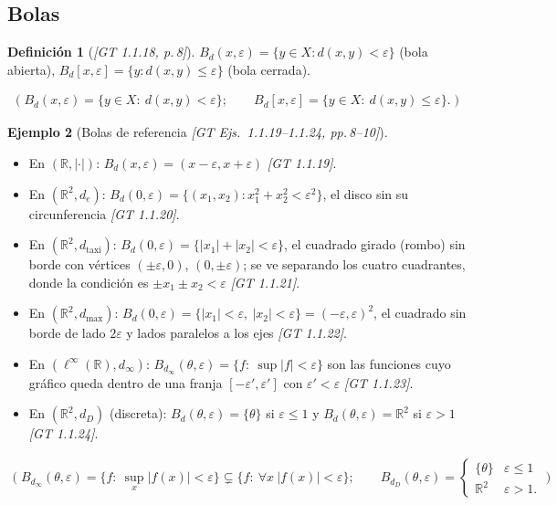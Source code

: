 \documentclass[11pt,a4paper]{article}
\newenvironment{lista}{\leavevmode\begin{itemize}[leftmargin=1.5em,itemsep=1pt,topsep=2pt,parsep=0pt]}{\end{itemize}}
\newcommand{\lgc}[1]{\par\vspace{-3pt}\begin{gather*}\big(\;#1\;\big)\end{gather*}\vspace{-6pt}}
\theoremstyle{definition}
\newtheorem{definicion}{Definición}[section]
\newtheorem{ejemplo}[definicion]{Ejemplo}
\theoremstyle{plain}
\newcommand{\fnt}[1]{{\normalfont\small\itshape\color{gray!150!black}[#1]}}
\newcommand{\R}{\mathbb{R}}
\newcommand{\Bola}[2]{B_d(#1,#2)}
\newcommand{\Bolac}[2]{B_d[#1,#2]}
\begin{document}
\subsection{Bolas}\label{sec:bolas}

\begin{definicion}[\fnt{GT 1.1.18, p.\,8}]
$\Bola{x}{\varepsilon}=\{y\in X: d(x,y)<\varepsilon\}$ (bola abierta), $\Bolac{x}{\varepsilon}=\{y: d(x,y)\le\varepsilon\}$ (bola cerrada).
\lgc{\Bola{x}{\varepsilon}=\{y\in X:\ d(x,y)<\varepsilon\};\qquad
\Bolac{x}{\varepsilon}=\{y\in X:\ d(x,y)\le\varepsilon\}.}
\end{definicion}

\begin{ejemplo}[Bolas de referencia \fnt{GT Ejs.\ 1.1.19--1.1.24, pp.\,8--10}]\label{hu:bolas}
\begin{lista}
\item En $(\R,|\cdot|)$: $\Bola{x}{\varepsilon}=(x-\varepsilon,x+\varepsilon)$ \fnt{GT 1.1.19}.
\item En $(\R^2,d_e)$: $\Bola{0}{\varepsilon}=\{(x_1,x_2): x_1^2+x_2^2<\varepsilon^2\}$, el disco sin su circunferencia \fnt{GT 1.1.20}.
\item En $(\R^2,d_{\text{taxi}})$: $\Bola{0}{\varepsilon}=\{|x_1|+|x_2|<\varepsilon\}$, el cuadrado girado (rombo) sin borde con vértices $(\pm\varepsilon,0)$, $(0,\pm\varepsilon)$; se ve separando los cuatro cuadrantes, donde la condición es $\pm x_1\pm x_2<\varepsilon$ \fnt{GT 1.1.21}.
\item En $(\R^2,d_{\max})$: $\Bola{0}{\varepsilon}=\{|x_1|<\varepsilon,\ |x_2|<\varepsilon\}=(-\varepsilon,\varepsilon)^2$, el cuadrado sin borde de lado $2\varepsilon$ y lados paralelos a los ejes \fnt{GT 1.1.22}.
\item En $(\ell^\infty(\R),d_\infty)$: $B_{d_\infty}(\theta,\varepsilon)=\{f:\ \sup|f|<\varepsilon\}$ son las funciones cuyo gráfico queda dentro de una franja $[-\varepsilon',\varepsilon']$ con $\varepsilon'<\varepsilon$ \fnt{GT 1.1.23}.
\item En $(\R^2,d_D)$ (discreta): $\Bola{\theta}{\varepsilon}=\{\theta\}$ si $\varepsilon\le1$ y $\Bola{\theta}{\varepsilon}=\R^2$ si $\varepsilon>1$ \fnt{GT 1.1.24}.
\end{lista}
\lgc{B_{d_\infty}(\theta,\varepsilon)=\{f:\ \sup_x|f(x)|<\varepsilon\}\subsetneq\{f:\ \forall x\ |f(x)|<\varepsilon\};\qquad
B_{d_D}(\theta,\varepsilon)=\begin{cases}\{\theta\}&\varepsilon\le1\\ \R^2&\varepsilon>1.\end{cases}}
\end{ejemplo}
\end{document}
